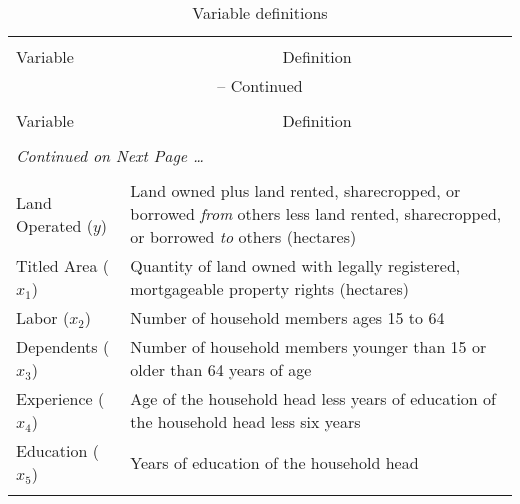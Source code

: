 \documentclass[english]{article}
\begin{document}
\footnotesize
\begin{longtable}{l  p{10.5cm}}
\caption[Variable definitions]{Variable definitions} \\[-2ex] 

\hline \hline \\[-5ex]
\multicolumn{1}{l}{Variable} &
\multicolumn{1}{c}{Definition}\\[0.0ex]   \hline
\endfirsthead

\multicolumn{2}{c}{\normalsize{\tablename} \thetable{} -- Continued} \\
\hline \hline \\[-5ex]
\multicolumn{1}{l}{Variable} &
\multicolumn{1}{c}{Definition}\\[0.0ex]  
  \\[-4.5ex]
\endhead

\multicolumn{2}{l}{{\textit{Continued on Next Page \ldots}}} \\
\endfoot

  \\[-1.8ex]
\endlastfoot

Land Operated ($y$) & Land owned plus land rented, sharecropped, or 
borrowed \emph{from} others less land rented, sharecropped, or borrowed 
\emph{to} others (hectares) \\

Titled Area ($x_1$) & Quantity of land owned with legally registered, 
mortgageable property rights (hectares)\\

Labor ($x_2$)  & Number of household members ages 15 to 64 \\

Dependents ($x_3$) & Number of household members younger than 15 or 
older than 64 years of age \\ 

Experience ($x_4$) & Age of the household head less years of education 
of the household head less six years \\ 

Education ($x_5$) & Years of education of the household head \\ \hline

\label{def}
\end{longtable}
\normalsize
\end{document}
